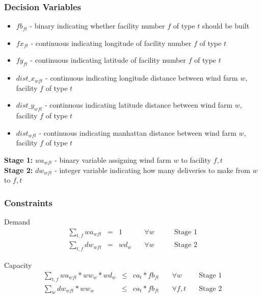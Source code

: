 \subsubsection{Decision Variables}
\begin{itemize} [noitemsep]
    \item $fb_{ft}$ - binary indicating whether facility number $f$ of type $t$ should be built
    \item $fx_{ft}$ - continuous indicating longitude of facility number $f$ of type $t$
    \item $fy_{ft}$ - continuous indicating latitude of facility number $f$ of type $t$ 

    \item $dist\_x_{wft}$ - continuous indicating longitude distance between wind farm $w$, facility $f$ of type $t$
    \item $dist\_y_{wft}$ - continuous indicating latitude distance between wind farm $w$, facility $f$ of type  $t$
    \item $dist_{wft}$ - continuous  indicating manhattan distance between wind farm $w$, facility $f$ of type $t$ 
\end{itemize}
\textbf{Stage 1:} $wa_{wft}$ - binary variable assigning wind farm $w$ to facility $f,t$ \\ 
\textbf{Stage 2:} $dw_{wft}$ - integer variable indicating how many deliveries to make from $w$ to $f,t$


\subsubsection{Constraints}
Demand
\vspace{-5pt}
\begin{equation}
\begin{aligned}
	\sum_{t,f} wa_{wft} 	& = & 1  		& \quad \forall w \quad \quad 	& \text{Stage 1} \\ 
	\sum_{t,f} dw_{wft} 	& = & wd_{w}  	& \quad \forall w \quad \quad 	& \text{Stage 2}
\end{aligned}
\end{equation}

Capacity
\vspace{-5pt}
\begin{equation}
\begin{aligned}
	\sum_{t,f} wa_{wft} * ww_{w} * wd_{w} 	& \le & ca_{t} * fb_{ft}		& \quad \forall w  \quad  	& \text{Stage 1} \\
        \sum_{w} dw_{wft} * ww_{w} 			& \le & ca_{t} * fb_{ft}  	& \quad \forall f,t \quad	& \text{Stage 2}
\end{aligned}
\end{equation}

